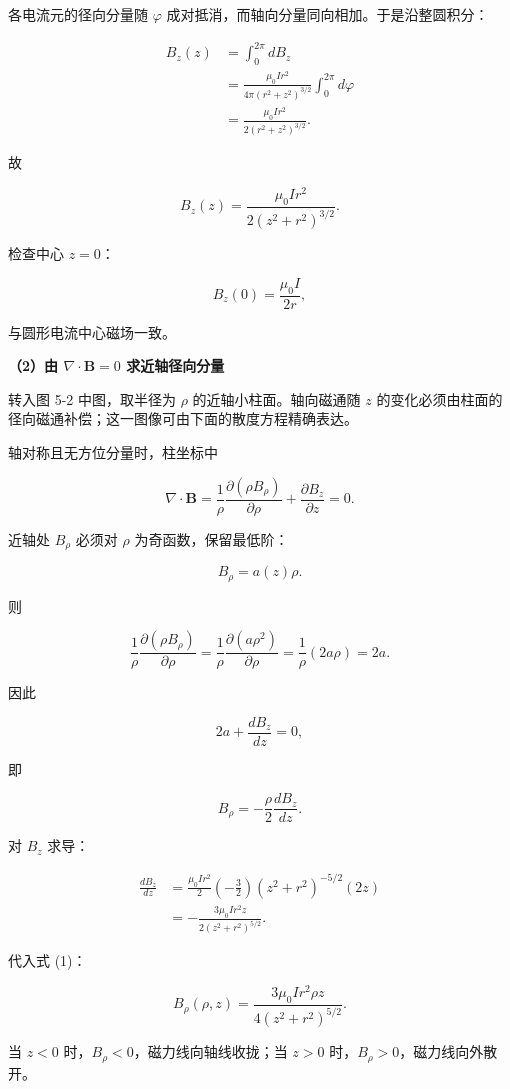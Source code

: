 \documentclass[12pt,a4paper,UTF8]{ctexart}
\begin{document}
各电流元的径向分量随 \(\varphi\)
成对抵消，而轴向分量同向相加。于是沿整圆积分：

\[
\begin{aligned}
B_z(z)
&=\int_0^{2\pi}dB_z\\
&=\frac{\mu_0Ir^2}{4\pi(r^2+z^2)^{3/2}}
\int_0^{2\pi}d\varphi\\
&=\frac{\mu_0Ir^2}{2(r^2+z^2)^{3/2}}.
\end{aligned}
\]

故

\[
\boxed{
B_z(z)=\frac{\mu_0Ir^2}{2(z^2+r^2)^{3/2}}
}.
\]

检查中心 \(z=0\)：

\[
B_z(0)=\frac{\mu_0I}{2r},
\]

与圆形电流中心磁场一致。

\textbf{（2）由 \(\nabla\cdot\bm B=0\) 求近轴径向分量}

转入图 5-2 中图，取半径为 \(\rho\) 的近轴小柱面。轴向磁通随 \(z\)
的变化必须由柱面的径向磁通补偿；这一图像可由下面的散度方程精确表达。

轴对称且无方位分量时，柱坐标中

\[
\nabla\cdot\bm B
=\frac1\rho\frac{\partial(\rho B_\rho)}{\partial\rho}
+\frac{\partial B_z}{\partial z}=0.
\]

近轴处 \(B_\rho\) 必须对 \(\rho\) 为奇函数，保留最低阶：

\[
B_\rho=a(z)\rho.
\]

则

\[
\frac1\rho\frac{\partial(\rho B_\rho)}{\partial\rho}
=\frac1\rho\frac{\partial(a\rho^2)}{\partial\rho}
=\frac1\rho(2a\rho)
=2a.
\]

因此

\[
2a+\frac{dB_z}{dz}=0,
\]

即

\[
\boxed{B_\rho=-\frac\rho2\frac{dB_z}{dz}}. \tag{1}
\]

对 \(B_z\) 求导：

\[
\begin{aligned}
\frac{dB_z}{dz}
&=\frac{\mu_0Ir^2}{2}
\left(-\frac32\right)(z^2+r^2)^{-5/2}(2z)\\
&=-\frac{3\mu_0Ir^2z}{2(z^2+r^2)^{5/2}}.
\end{aligned}
\]

代入式 (1)：

\[
\boxed{
B_\rho(\rho,z)
=\frac{3\mu_0Ir^2\rho z}{4(z^2+r^2)^{5/2}}
}.
\]

当 \(z<0\) 时，\(B_\rho<0\)，磁力线向轴线收拢；当 \(z>0\)
时，\(B_\rho>0\)，磁力线向外散开。
\end{document}
